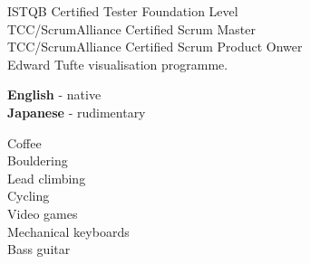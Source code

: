 \documentclass[8pt]{developercv}
\begin{document}
\begin{minipage}[t]{0.3\textwidth}
	\vspace{-\baselineskip} %

	\raggedright

	ISTQB Certified Tester Foundation Level\\
	TCC/ScrumAlliance Certified Scrum Master\\
	TCC/ScrumAlliance Certified Scrum Product Onwer\\
	Edward Tufte visualisation programme.
\end{minipage}
\hfill
\begin{minipage}[t]{0.3\textwidth}
	\vspace{-\baselineskip} %

	\raggedright

	\textbf{English} - native\\
	\textbf{Japanese} - rudimentary
\end{minipage}
\hfill
\begin{minipage}[t]{0.3\textwidth}
	\vspace{-\baselineskip} %

	\raggedright

	Coffee\\
	Bouldering\\
	Lead climbing\\
	Cycling\\
	Video games\\
	Mechanical keyboards\\
	Bass guitar
\end{minipage}
\end{document}
